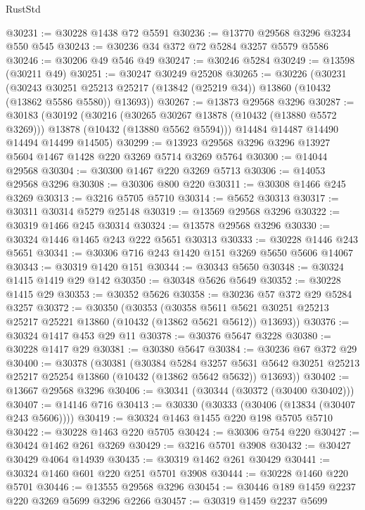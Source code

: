 \begin{lexlean}{RustStd}
\begin{coremodule}
@30231 := @30228 @1438 @72 @5591
@30236 := @13770 @29568 @3296 @3234 @550 @545
@30243 := @30236 @34 @372 @72 @5284 @3257 @5579 @5586
@30246 := @30206 @49 @546 @49
@30247 := @30246 @5284
@30249 := @13598 (@30211 @49)
@30251 := @30247 @30249 @25208
@30265 := @30226
    (@30231
      (@30243
        @30251
        @25213
        @25217
        (@13842 (@25219 @34))
        @13860
        (@10432 (@13862 @5586 @5580))
        @13693))
@30267 := @13873 @29568 @3296
@30287 := @30183
    (@30192
      (@30216
        (@30265 @30267 @13878 (@10432 (@13880 @5572 @3269)))
        @13878
        (@10432 (@13880 @5562 @5594)))
      @14484
      @14487
      @14490
      @14494
      @14499
      @14505)
@30299 := @13923 @29568 @3296 @3296 @13927 @5604 @1467 @1428 @220 @3269 @5714 @3269 @5764
@30300 := @14044 @29568
@30304 := @30300 @1467 @220 @3269 @5713
@30306 := @14053 @29568 @3296
@30308 := @30306 @800 @220
@30311 := @30308 @1466 @245 @3269
@30313 := @3216 @5705 @5710
@30314 := @5652 @30313
@30317 := @30311 @30314 @5279 @25148
@30319 := @13569 @29568 @3296
@30322 := @30319 @1466 @245 @30314
@30324 := @13578 @29568 @3296
@30330 := @30324 @1446 @1465 @243 @222 @5651 @30313
@30333 := @30228 @1446 @243 @5651
@30341 := @30306 @716 @243 @1420 @151 @3269 @5650 @5606 @14067
@30343 := @30319 @1420 @151
@30344 := @30343 @5650
@30348 := @30324 @1415 @1419 @29 @142
@30350 := @30348 @5626 @5649
@30352 := @30228 @1415 @29
@30353 := @30352 @5626
@30358 := @30236 @57 @372 @29 @5284 @3257
@30372 := @30350
    (@30353
      (@30358 @5611 @5621 @30251 @25213 @25217 @25221 @13860 (@10432 (@13862 @5621 @5612)) @13693))
@30376 := @30324 @1417 @453 @29 @11
@30378 := @30376 @5647 @3228
@30380 := @30228 @1417 @29
@30381 := @30380 @5647
@30384 := @30236 @67 @372 @29
@30400 := @30378
    (@30381
      (@30384
        @5284
        @3257
        @5631
        @5642
        @30251
        @25213
        @25217
        @25254
        @13860
        (@10432 (@13862 @5642 @5632))
        @13693))
@30402 := @13667 @29568 @3296
@30406 := @30341 (@30344 (@30372 (@30400 @30402)))
@30407 := @14146 @716
@30413 := @30330 (@30333 (@30406 (@13834 (@30407 @243 @5606))))
@30419 := @30324 @1463 @1455 @220 @198 @5705 @5710
@30422 := @30228 @1463 @220 @5705
@30424 := @30306 @754 @220
@30427 := @30424 @1462 @261 @3269
@30429 := @3216 @5701 @3908
@30432 := @30427 @30429 @4064 @14939
@30435 := @30319 @1462 @261 @30429
@30441 := @30324 @1460 @601 @220 @251 @5701 @3908
@30444 := @30228 @1460 @220 @5701
@30446 := @13555 @29568 @3296
@30454 := @30446 @189 @1459 @2237 @220 @3269 @5699 @3296 @2266
@30457 := @30319 @1459 @2237 @5699

\end{coremodule}
\end{lexlean}
